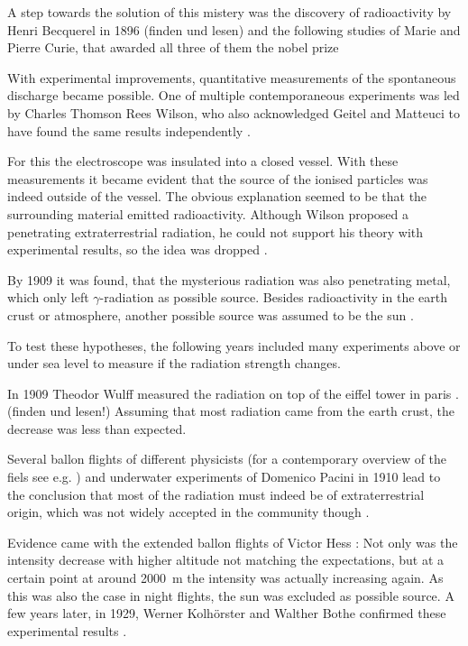 A step towards the solution of this mistery was the discovery 
of radioactivity by Henri Becquerel in 1896 
\cite{becquerel1896emission} (finden und lesen)
and the following studies of Marie and Pierre Curie, 
that awarded all three of them the nobel prize \cite{nobel_curie}

With experimental improvements, quantitative measurements
of the spontaneous discharge became possible.
One of multiple contemporaneous experiments was 
led by Charles Thomson Rees Wilson, who also 
acknowledged Geitel and Matteuci to have found the same 
results independently
\cite{doi:10.1098/rspl.1901.0032}.

For this the electroscope was insulated into a closed vessel.
With these measurements it became evident that the source 
of the ionised particles was indeed outside of the vessel.
The obvious explanation seemed to be that the surrounding material 
emitted radioactivity.
Although Wilson proposed a penetrating extraterrestrial radiation, 
he could not support his theory with experimental results, 
so the idea was dropped \cite{bookap}.

By 1909 it was found, that the mysterious radiation was also 
penetrating metal, which only left $\gamma$-radiation as 
possible source. Besides radioactivity in the earth crust or atmosphere,
another possible source was assumed to be the sun \cite{bookap}.

To test these hypotheses, the following years included many experiments 
above or under sea level to measure if the radiation strength changes.

In 1909 Theodor Wulff measured the radiation on top of the 
eiffel tower in paris
\cite{wulf1909atmosphare}. (finden und lesen!)
Assuming that most radiation came from the 
earth crust, the decrease was less than expected.

Several ballon flights 
of different physicists (for a contemporary overview of the fiels see e.g. \cite{luftelektrizitaet})
and underwater experiments of Domenico Pacini in 1910 
\cite{2011arXiv1101.3015P}
lead to the conclusion that most of the radiation must indeed be
of extraterrestrial origin, which was not widely accepted 
in the community though \cite{bookap}.

Evidence came with the extended ballon flights of Victor Hess
\cite{Hess:1912srp}:
Not only was the intensity decrease with higher altitude not 
matching the expectations, but at a certain point at around 
\SI{2000}{\meter} the intensity 
was actually increasing again.
As this was also the case in night flights, the sun
was excluded as possible source.
A few years later, in 1929, Werner Kolhörster and 
Walther Bothe confirmed these experimental results \cite{bothe1929wesen}.

